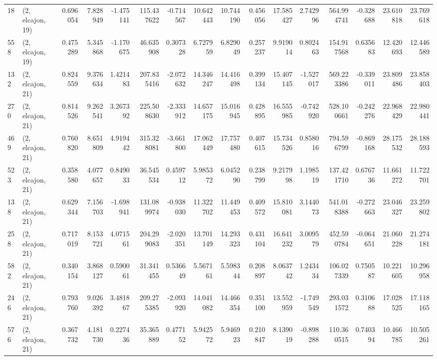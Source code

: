 \begin{tabular}{llrrrrrrrrrrrrrr}
18  &  (2, elcajon, 19) &   0.696054 &   7.828949 &  -1.475141 &   115.437622 &  -0.714567 &  10.642443 &  10.744190 &  0.456056 &  17.585427 &   2.742996 &    564.994741 &  -0.328688 &  23.610818 &   23.769618 \\
558 &  (2, elcajon, 19) &   0.475289 &   5.345868 &  -1.170675 &    46.635908 &   0.307328 &   6.727959 &   6.829049 &  0.257237 &   9.919014 &   0.802463 &    154.917568 &   0.635683 &  12.420693 &   12.446589 \\
132 &  (2, elcajon, 21) &   0.824559 &   9.376634 &   1.421483 &   207.835416 &  -2.072632 &  14.346247 &  14.416498 &  0.399134 &  15.407145 &  -1.527017 &    569.223386 &  -0.339011 &  23.809486 &   23.858403 \\
270 &  (2, elcajon, 21) &   0.814526 &   9.262541 &   3.267392 &   225.508630 &  -2.333912 &  14.657175 &  15.016945 &  0.428895 &  16.555985 &  -0.742920 &    528.100661 &  -0.242276 &  22.968429 &   22.980441 \\
469 &  (2, elcajon, 21) &   0.760820 &   8.651809 &   4.919442 &   315.328081 &  -3.661800 &  17.062449 &  17.757480 &  0.407615 &  15.734526 &   0.858016 &    794.596799 &  -0.869168 &  28.175532 &   28.188593 \\
523 &  (2, elcajon, 21) &   0.358580 &   4.077657 &   0.849033 &    36.545534 &   0.459712 &   5.985372 &   6.045290 &  0.238799 &   9.217998 &   1.198519 &    137.421710 &   0.676736 &  11.661272 &   11.722701 \\
138 &  (2, elcajon, 21) &   0.629344 &   7.156703 &  -1.698941 &   131.089974 &  -0.938030 &  11.322702 &  11.449453 &  0.409572 &  15.810081 &   3.144073 &    541.018388 &  -0.272663 &  23.046327 &   23.259802 \\
258 &  (2, elcajon, 21) &   0.717019 &   8.153721 &   4.071561 &   204.299083 &  -2.020351 &  13.701149 &  14.293323 &  0.431104 &  16.641232 &   3.009579 &    452.590784 &  -0.064651 &  21.060228 &   21.274181 \\
582 &  (2, elcajon, 21) &   0.340154 &   3.868127 &   0.590061 &    31.341455 &   0.536649 &   5.567161 &   5.598344 &  0.208897 &   8.063742 &   1.243434 &    106.027339 &   0.750587 &  10.221605 &   10.296958 \\
246 &  (2, elcajon, 21) &   0.793760 &   9.026392 &   3.481867 &   209.275385 &  -2.093920 &  14.041082 &  14.466354 &  0.351100 &  13.552959 &  -1.749549 &    293.031572 &   0.310688 &  17.028525 &   17.118165 \\
576 &  (2, elcajon, 21) &   0.367732 &   4.181730 &   0.227436 &    35.365889 &   0.477152 &   5.942572 &   5.946923 &  0.210847 &   8.139019 &  -0.898288 &    110.360515 &   0.740394 &  10.466785 &   10.505261 \\

\end{tabular}
